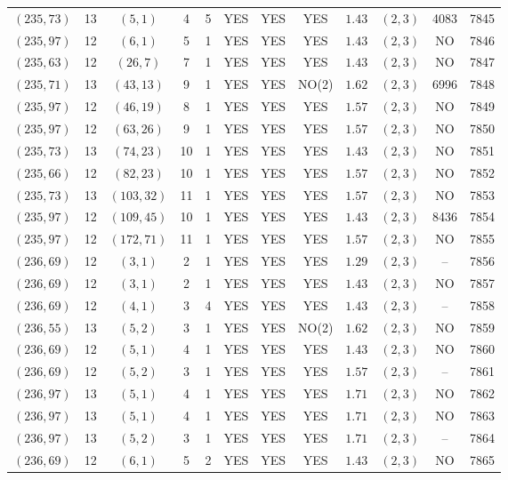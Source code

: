 \begin{longtable}{|c|c|c|c|c|c|c|c|c|c|c|c|}
$(235,73)$ & 13 & $(5,1)$ & 4 & 5 & YES & YES & YES & $1.43$ & $(2,3)$ & 4083 & 7845\\
$(235,97)$ & 12 & $(6,1)$ & 5 & 1 & YES & YES & YES & $1.43$ & $(2,3)$ & NO & 7846\\
$(235,63)$ & 12 & $(26,7)$ & 7 & 1 & YES & YES & YES & $1.43$ & $(2,3)$ & NO & 7847\\
$(235,71)$ & 13 & $(43,13)$ & 9 & 1 & YES & YES & NO(2) & $1.62$ & $(2,3)$ & 6996 & 7848\\
$(235,97)$ & 12 & $(46,19)$ & 8 & 1 & YES & YES & YES & $1.57$ & $(2,3)$ & NO & 7849\\
$(235,97)$ & 12 & $(63,26)$ & 9 & 1 & YES & YES & YES & $1.57$ & $(2,3)$ & NO & 7850\\
$(235,73)$ & 13 & $(74,23)$ & 10 & 1 & YES & YES & YES & $1.43$ & $(2,3)$ & NO & 7851\\
$(235,66)$ & 12 & $(82,23)$ & 10 & 1 & YES & YES & YES & $1.57$ & $(2,3)$ & NO & 7852\\
$(235,73)$ & 13 & $(103,32)$ & 11 & 1 & YES & YES & YES & $1.57$ & $(2,3)$ & NO & 7853\\
$(235,97)$ & 12 & $(109,45)$ & 10 & 1 & YES & YES & YES & $1.43$ & $(2,3)$ & 8436 & 7854\\
$(235,97)$ & 12 & $(172,71)$ & 11 & 1 & YES & YES & YES & $1.57$ & $(2,3)$ & NO & 7855\\
$(236,69)$ & 12 & $(3,1)$ & 2 & 1 & YES & YES & YES & $1.29$ & $(2,3)$ & -- & 7856\\
$(236,69)$ & 12 & $(3,1)$ & 2 & 1 & YES & YES & YES & $1.43$ & $(2,3)$ & NO & 7857\\
$(236,69)$ & 12 & $(4,1)$ & 3 & 4 & YES & YES & YES & $1.43$ & $(2,3)$ & -- & 7858\\
$(236,55)$ & 13 & $(5,2)$ & 3 & 1 & YES & YES & NO(2) & $1.62$ & $(2,3)$ & NO & 7859\\
$(236,69)$ & 12 & $(5,1)$ & 4 & 1 & YES & YES & YES & $1.43$ & $(2,3)$ & NO & 7860\\
$(236,69)$ & 12 & $(5,2)$ & 3 & 1 & YES & YES & YES & $1.57$ & $(2,3)$ & -- & 7861\\
$(236,97)$ & 13 & $(5,1)$ & 4 & 1 & YES & YES & YES & $1.71$ & $(2,3)$ & NO & 7862\\
$(236,97)$ & 13 & $(5,1)$ & 4 & 1 & YES & YES & YES & $1.71$ & $(2,3)$ & NO & 7863\\
$(236,97)$ & 13 & $(5,2)$ & 3 & 1 & YES & YES & YES & $1.71$ & $(2,3)$ & -- & 7864\\
$(236,69)$ & 12 & $(6,1)$ & 5 & 2 & YES & YES & YES & $1.43$ & $(2,3)$ & NO & 7865\\

\end{longtable}
